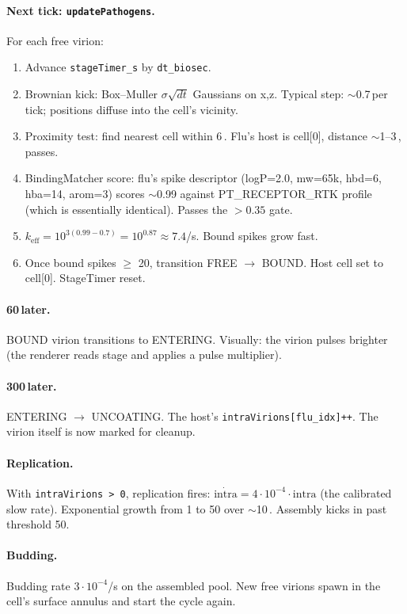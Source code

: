 \documentclass[11pt,letterpaper,twoside,openany]{book}
\newcommand{\code}[1]{\texttt{#1}}
\newcommand{\biomin}{\text{bio-min}}
\newcommand{\biosec}{\text{bio-s}}
\newcommand{\wu}{\text{wu}}
\begin{document}
\paragraph{Next tick: \code{updatePathogens}.} For each free virion:
\begin{enumerate}
  \item Advance \code{stageTimer\_s} by \code{dt\_biosec}.
  \item Brownian kick: Box--Muller $\sigma\sqrt{dt}$ Gaussians on
        x,z. Typical step: $\sim$0.7\,\wu per tick; positions
        diffuse into the cell's vicinity.
  \item Proximity test: find nearest cell within 6\,\wu. Flu's
        host is cell[0], distance $\sim$1--3\,\wu, passes.
  \item BindingMatcher score: flu's spike descriptor
        (logP=2.0, mw=65k, hbd=6, hba=14, arom=3) scores $\sim$0.99
        against PT\_RECEPTOR\_RTK profile (which is essentially
        identical). Passes the $> 0.35$ gate.
  \item $k_{\text{eff}} = 10^{3(0.99-0.7)} = 10^{0.87} \approx
        7.4$/s. Bound spikes grow fast.
  \item Once bound spikes $\geq$ 20, transition FREE $\to$ BOUND.
        Host cell set to cell[0]. StageTimer reset.
\end{enumerate}

\paragraph{60\,\biosec later.} BOUND virion transitions to
ENTERING. Visually: the virion pulses brighter (the renderer
reads stage and applies a pulse multiplier).

\paragraph{300\,\biosec later.} ENTERING $\to$ UNCOATING. The
host's \code{intraVirions[flu\_idx]++}. The virion itself is now
marked for cleanup.

\paragraph{Replication.} With \code{intraVirions > 0}, replication
fires: $\dot{\text{intra}} = 4\cdot 10^{-4}\cdot\text{intra}$ (the
calibrated slow rate). Exponential growth from 1 to 50 over
$\sim$10\,\biomin. Assembly kicks in past threshold 50.

\paragraph{Budding.} Budding rate $3\cdot 10^{-4}$/s on the
assembled pool. New free virions spawn in the cell's surface
annulus and start the cycle again.
\end{document}
